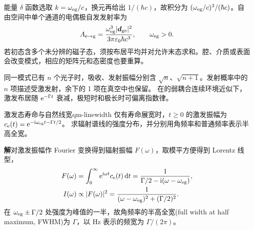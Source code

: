 能量 $\delta$ 函数选取 $k = \omega_{\mathrm{e}\mathrm{g}}/c$，换元再给出 $1/(\hbar c)$，故积分为 $(\omega_{\mathrm{e}\mathrm{g}}/c)^3/(\hbar c)$。自由空间中单个通道的电偶极自发发射率为
\begin{equation}
    A_{\mathrm{e}\to\mathrm{g}} = \frac{\omega_{\mathrm{e}\mathrm{g}}^3\lvert\bm d_{\mathrm{g}\mathrm{e}}\rvert^2}
    {3\pi\varepsilon_0\hbar c^3},\qquad\omega_{\mathrm{e}\mathrm{g}} > 0.
    \label{eq:spontaneous}
\end{equation}
若初态含多个未分辨的磁子态，须按布居平均并对允许末态求和。腔、介质或表面会改变模式，相应的矩阵元和态密度也要重算。

同一模式已有 $n$ 个光子时，吸收、发射振幅分别含 $\sqrt n$、$\sqrt{n + 1}$。发射概率中的 $n$ 项描述受激发射，余下的 1 项在真空中也保留。
在的弱耦合连续环境近似下，激发布居随 $\mathop{}\!\mathrm{e}^{-\Gamma t}$ 衰减，极短时和极长时可偏离指数律。

\begin{example}{激发态寿命与自然线宽}{qm-linewidth}
    仅有寿命展宽时，$t \geq 0$ 的激发振幅为 $c_{\mathrm{e}}(t) = \mathop{}\!\mathrm{e}^{-\mathrm{i}\omega_{\mathrm{e}\mathrm{g}}t-\Gamma t/2}$。
    求辐射谱线的强度分布，并分别用角频率和普通频率表示半高全宽。

    \par\smallskip\textbf{解}\quad 对激发振幅作 Fourier 变换得到辐射振幅 $F(\omega)$，取模平方便得到 Lorentz 线型，
    \begin{subequations}
        \begin{align}
            F(\omega) &= \int_0^\infty \mathop{}\!\mathrm{e}^{\mathrm{i}\omega t}c_{\mathrm{e}}(t)\mathop{}\!\mathrm{d} t
              = \frac1{\Gamma/2 - \mathrm{i}(\omega - \omega_{\mathrm{e}\mathrm{g}})},\\*
            I(\omega) &\propto \lvert F(\omega)\rvert^2 =
            \frac1{(\omega - \omega_{\mathrm{e}\mathrm{g}})^2 + (\Gamma/2)^2}.
        \end{align}
    \end{subequations}
    在 $\omega_{\mathrm{e}\mathrm{g}} \pm \Gamma/2$ 处强度为峰值的一半，故角频率的半高全宽(full width at half maximum, FWHM)为 $\Gamma$，以 \unit{Hz} 表示的频宽为 $\Gamma/(2\pi)$。
\end{example}

